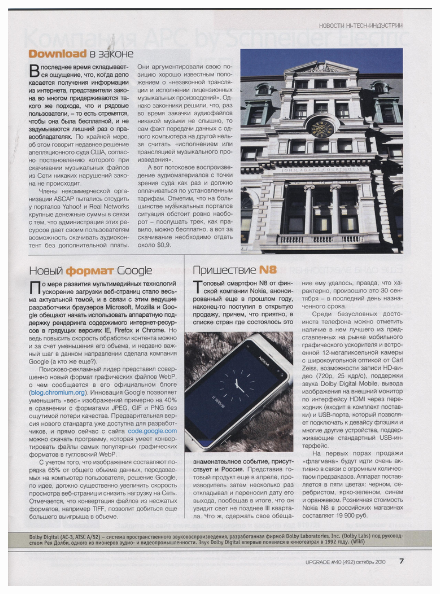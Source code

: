 \documentclass{book}
\begin{document}
\begin{figure}[H]
\begin{center}
\includegraphics[scale=0.2]{images/4.jpg}

\end{center}
\end{figure}
\end{document}
